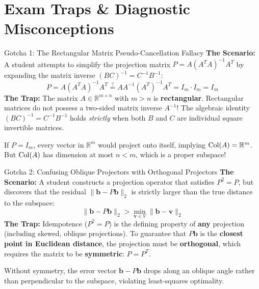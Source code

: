 \section{Exam Traps \& Diagnostic Misconceptions}

\begin{trapbox}{Gotcha 1: The Rectangular Matrix Pseudo-Cancellation Fallacy}
\textbf{The Scenario:} A student attempts to simplify the projection matrix $P = A(A^T A)^{-1}A^T$ by expanding the matrix inverse $(BC)^{-1} = C^{-1} B^{-1}$:
\begin{equation*}
P = A (A^T A)^{-1} A^T \stackrel{?}{=} A A^{-1} (A^T)^{-1} A^T = I_m \cdot I_m = I_m
\end{equation*}
\textbf{The Trap:} The matrix $A \in \mathbb{R}^{m \times n}$ with $m > n$ is \textbf{rectangular}. Rectangular matrices do not possess a two-sided matrix inverse $A^{-1}$! The algebraic identity $(BC)^{-1} = C^{-1}B^{-1}$ holds \emph{strictly} when both $B$ and $C$ are individual square invertible matrices. 

If $P = I_m$, every vector in $\mathbb{R}^m$ would project onto itself, implying $\operatorname{Col}(A) = \mathbb{R}^m$. But $\operatorname{Col}(A)$ has dimension at most $n < m$, which is a proper subspace!
\end{trapbox}

\begin{trapbox}{Gotcha 2: Confusing Oblique Projectors with Orthogonal Projectors}
\textbf{The Scenario:} A student constructs a projection operator that satisfies $P^2 = P$, but discovers that the residual $\|\mathbf{b} - P\mathbf{b}\|_2$ is strictly larger than the true distance to the subspace:
\begin{equation*}
\|\mathbf{b} - P\mathbf{b}\|_2 > \min_{\mathbf{v} \in V} \|\mathbf{b} - \mathbf{v}\|_2
\end{equation*}
\textbf{The Trap:} Idempotence ($P^2 = P$) is the defining property of \textbf{any} projection (including skewed, oblique projections). To guarantee that $P\mathbf{b}$ is the \textbf{closest point in Euclidean distance}, the projection must be \textbf{orthogonal}, which requires the matrix to be \textbf{symmetric}: $P = P^T$. 

Without symmetry, the error vector $\mathbf{b} - P\mathbf{b}$ drops along an oblique angle rather than perpendicular to the subspace, violating least-squares optimality.
\end{trapbox}

